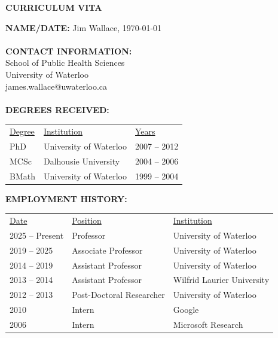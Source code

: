 \documentclass[12pt]{article}
\begin{document}
\noindent

\thispagestyle{empty}
\begin{center}
\textbf{CURRICULUM VITA}
\end{center}

\textbf{NAME/DATE:} Jim Wallace, \usvardate\today
\\ \\
\textbf{CONTACT INFORMATION:} \\
School of Public Health Sciences \\
University of Waterloo \\
james.wallace@uwaterloo.ca
\\ \\
\textbf{DEGREES RECEIVED:} 

\begin{table}[h!]
\centering
\begin{tabular}{p{2.5cm} p{5cm} p{5cm}}
\underline{Degree}              & \underline{Institution}              & \underline{Years} \\
PhD                 & University of Waterloo   & 2007 – 2012  \\
MCSc                & Dalhousie University     & 2004 – 2006  \\
BMath               & University of Waterloo   & 1999 – 2004  \\
\end{tabular}
\end{table}

\textbf{EMPLOYMENT HISTORY:}
\begin{table}[h!]
\centering
\begin{tabular}{p{3.5cm} l l}
\underline{Date}                & \underline{Position}                 & \underline{Institution} \\
2025 -- Present     & Professor                & University of Waterloo \\
2019 – 2025         & Associate Professor      & University of Waterloo  \\
2014 – 2019         & Assistant Professor      & University of Waterloo   \\
2013 – 2014         & Assistant Professor      & Wilfrid Laurier University \\
2012 – 2013         & Post-Doctoral Researcher & University of Waterloo  \\
2010                & Intern                   & Google     \\
2006                & Intern                   & Microsoft Research 
\end{tabular}
\end{table}
\end{document}
